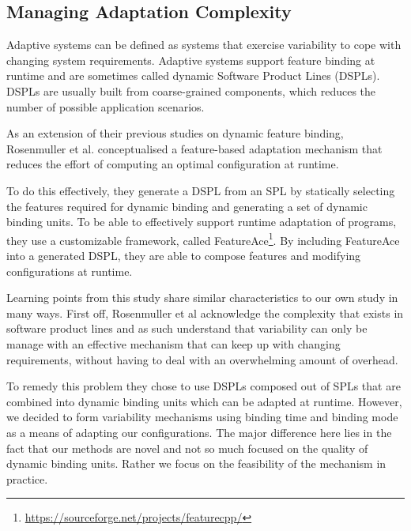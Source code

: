 \documentclass[conference]{IEEEtran}
\newcommand{\foot}[1]{\footnote{\url{#1}}}
\begin{document}
\subsection{Managing Adaptation Complexity}
Adaptive systems can be defined as systems that exercise variability to cope with changing system requirements. Adaptive systems support feature binding at runtime and are sometimes called dynamic Software Product Lines (DSPLs). DSPLs are usually built from coarse-grained components, which reduces the number of possible application scenarios. 

As an extension of their previous studies on dynamic feature binding, Rosenmuller et al. \cite{tailor-spl}  conceptualised a feature-based adaptation mechanism that reduces the effort of computing an optimal configuration at runtime. 

To do this effectively, they generate a DSPL from an SPL by statically selecting the features required for dynamic binding and generating a set of dynamic
binding units. To be able to effectively support runtime adaptation of programs, they use a customizable framework, called FeatureAce\foot{https://sourceforge.net/projects/featurecpp/}. By including FeatureAce into a generated DSPL, they are able to compose features and modifying configurations at runtime.

Learning points from this study share similar characteristics to our own study in many ways. First off, Rosenmuller et al\cite{tailor-spl} acknowledge the complexity that exists in software product lines and as such understand that variability can only be manage with an effective mechanism that can keep up with changing requirements, without having to deal with an overwhelming amount of overhead.

 To remedy this problem they chose to use DSPLs composed out of SPLs that are combined into dynamic binding units which can be adapted at runtime. However, we decided to form variability mechanisms using binding time and binding mode as a means of adapting our configurations. The major difference here lies in the fact that our methods are novel and not so much focused on the quality of dynamic binding units. Rather we focus on the feasibility of the mechanism in practice.
 
\end{document}
